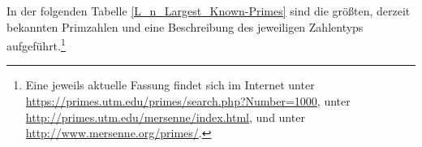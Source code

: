 \begin{refsegment}
In der folgenden Tabelle \ref{L_n_Largest_Known-Primes} sind die größten, derzeit bekannten Primzahlen und
eine Beschreibung des jeweiligen Zahlentyps aufgeführt.\footnote{%
Eine jeweils aktuelle Fassung findet sich im Internet
unter  \url{https://primes.utm.edu/primes/search.php?Number=1000},
unter  \url{http://primes.utm.edu/mersenne/index.html}, und
unter  \url{http://www.mersenne.org/primes/}.
}
%


\ignoreoutput{\rowno[0]} %


\end{refsegment}
